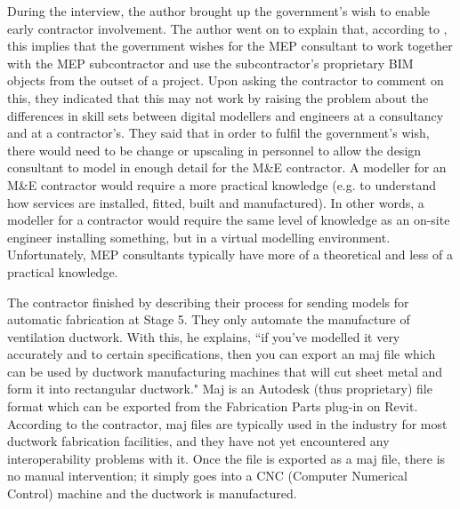 During the interview, the author brought up the government's wish to enable early contractor involvement.
The author went on to explain that, according to \cite{Conaghan2017}, this implies that the government wishes for the MEP consultant to work together with the MEP subcontractor and use the subcontractor's proprietary BIM objects from the outset of a project.
Upon asking the contractor to comment on this, they indicated that this may not work by raising the problem about 
the differences in skill sets between digital modellers and engineers at a consultancy and at a contractor's.
They said that in order to fulfil the government's wish, there would need to be change or upscaling in personnel to allow the design consultant to model in enough detail for the M\&E contractor.
A modeller for an M\&E contractor would require a more practical knowledge (e.g. to understand how services are installed, fitted, built and manufactured).
In other words, a modeller for a contractor would require the same level of knowledge as an on-site engineer installing something, but in a virtual modelling environment.
Unfortunately, MEP consultants typically have more of a theoretical and less of a practical knowledge.

The contractor finished by describing their process for sending models for automatic fabrication at Stage 5.
They only automate the manufacture of ventilation ductwork.
With this, he explains, ``if you've modelled it very accurately and to certain specifications, then you can export an maj file which can be used by ductwork manufacturing machines that will cut sheet metal and form it into rectangular ductwork."
Maj is an Autodesk (thus proprietary) file format which can be exported from the Fabrication Parts plug-in on Revit.
According to the contractor, maj files are typically used in the industry for most ductwork fabrication facilities, and they have not yet encountered any interoperability problems with it.
Once the file is exported as a maj file, there is no manual intervention;
it simply goes into a CNC (Computer Numerical Control) machine and the ductwork is manufactured.


